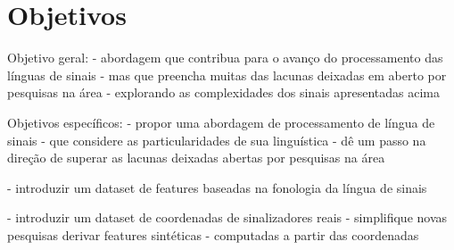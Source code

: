 \section{Objetivos}
\label{objetivos}

Objetivo geral:
- abordagem que contribua para o avanço do processamento das línguas de sinais 
    - mas que preencha muitas das lacunas deixadas em aberto por pesquisas na área
    - explorando as complexidades dos sinais apresentadas acima

Objetivos específicos:
- propor uma abordagem de processamento de língua de sinais 
    - que considere as particularidades de sua linguística
    - dê um passo na direção de superar as lacunas deixadas abertas por pesquisas na área 
    
- introduzir um dataset de features baseadas na fonologia da língua de sinais

- introduzir um dataset de coordenadas de sinalizadores reais 
    - simplifique novas pesquisas derivar features sintéticas 
    - computadas a partir das coordenadas 
